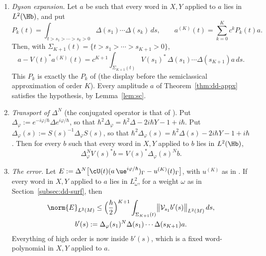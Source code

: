\begin{proposition}\label{prop:dd-id}
\begin{enumerate}
\item[\textup{(D1)}] \emph{Dyson expansion.} Let $a$ be such that every word in $X,Y$ applied to $a$ lies in $L^2(\Hb)$, and put
\[
P_k(t)=\int_{t>s_1>\cdots>s_k>0}\Delta(s_1)\cdots\Delta(s_k)\,ds,\qquad a^{(K)}(t)=\sum_{k=0}^{K}c^kP_k(t)a .
\]
Then, with $\Sigma_{K+1}(t)=\{t>s_1>\cdots>s_{K+1}>0\}$,
\[
a-V(t)^*a^{(K)}(t)=c^{K+1}\int_{\Sigma_{K+1}(t)}V(s_1)^*\,\Delta(s_1)\cdots\Delta(s_{K+1})a\,ds .
\]
This $P_k$ is exactly the $P_k$ of \cite{S}
(the display before the semiclassical approximation of order $K$). Every amplitude $a$ of Theorem~\ref{thm:dd-appx} satisfies the
hypothesis, by Lemma~\ref{lem:sc}.
\item[\textup{(D3)}] \emph{Transport of $\Delta^N$} (the conjugated operator is that of \cite[Proposition~2.2 and the proof of Proposition~3.10, (3.31)--(3.34)]{S}). Put $\Delta_\varphi:=e^{-i\varphi/\hbar}\Delta e^{i\varphi/\hbar}$, so that
$\hbar^2\Delta_\varphi=\hbar^2\Delta-2i\hbar Y-1+i\hbar$. Put $\Delta_\varphi(s):=S(s)^{-1}\Delta_\varphi S(s)$, so that
$\hbar^2\Delta_\varphi(s)=\hbar^2\Delta(s)-2i\hbar Y-1+i\hbar$. Then for every $b$ such that every word in $X,Y$ applied to $b$ lies in $L^2(\Hb)$,
\[
\Delta_\varphi^N V(s)^*b=V(s)^*\Delta_\varphi(s)^Nb.
\]
\item[\textup{(D4)}] \emph{The error.} Let $E:=\Delta^N\bigl[\cU(t)(a\,\ue^{i\varphi/\hbar})_\Gamma-u^{(K)}(t)_\Gamma\bigr]$, with $u^{(K)}$ as in \cite{S}. If every word in $X,Y$ applied to $a$ lies in $L^2_\omega$, for a weight $\omega$ as in Section~\ref{subsec:dd-surf}, then
\[
\begin{gathered}
\norm{E}_{L^2(M)}\le\Bigl(\frac{\hbar}{2}\Bigr)^{K+1}\int_{\Sigma_{K+1}(t)}\bigl\|\mathcal V_{s_1}b'(s)\bigr\|_{L^2(M)}\,ds,\\
b'(s):=\Delta_\varphi(s_1)^N\Delta(s_1)\cdots\Delta(s_{K+1})a.
\end{gathered}
\]
Everything of high order is now inside $b'(s)$, which is a fixed word-polynomial in $X,Y$ applied to $a$.
\end{enumerate}
\end{proposition}

